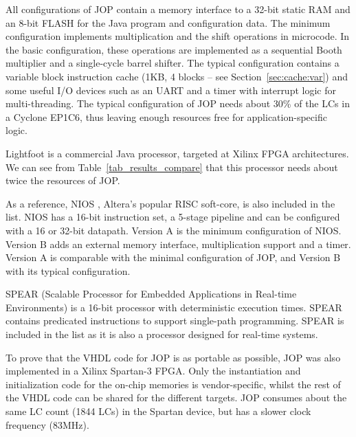  

All configurations of JOP contain a memory interface to a 32-bit
static RAM and an 8-bit FLASH for the Java program and configuration
data. The minimum configuration implements multiplication and the
shift operations in microcode. In the basic configuration, these
operations are implemented as a sequential Booth multiplier and a
single-cycle barrel shifter. The typical configuration contains a
variable block instruction cache (1KB, 4 blocks -- see
Section~\ref{sec:cache:var}) and some useful I/O devices such as an
UART and a timer with interrupt logic for multi-threading. The
typical configuration of JOP needs about 30\% of the LCs in a
Cyclone EP1C6, thus leaving enough resources free for
application-specific logic.

Lightfoot \cite{Lightfoot} is a commercial Java processor, targeted
at Xilinx FPGA architectures. We can see from
Table~\ref{tab_results_compare} that this processor needs about
twice the resources of JOP.

As a reference, NIOS \cite{NIOS}, Altera's popular RISC soft-core,
is also included in the list. NIOS has a 16-bit instruction set, a
5-stage pipeline and can be configured with a 16 or 32-bit datapath.
Version A is the minimum configuration of NIOS. Version B adds an
external memory interface, multiplication support and a timer.
Version A is comparable with the minimal configuration of JOP, and
Version B with its typical configuration.

SPEAR \cite{Delvai:ECRTS2003} (Scalable Processor for Embedded
Applications in Real-time Environments) is a 16-bit processor with
deterministic execution times. SPEAR contains predicated
instructions to support single-path programming. SPEAR is included
in the list as it is also a processor designed for real-time
systems.

To prove that the VHDL code for JOP is as portable as possible, JOP
was also implemented in a Xilinx Spartan-3 FPGA. Only the
instantiation and initialization code for the on-chip memories is
vendor-specific, whilst the rest of the VHDL code can be shared for
the different targets. JOP consumes about the same LC count (1844
LCs) in the Spartan device, but has a slower clock frequency
(83MHz).

